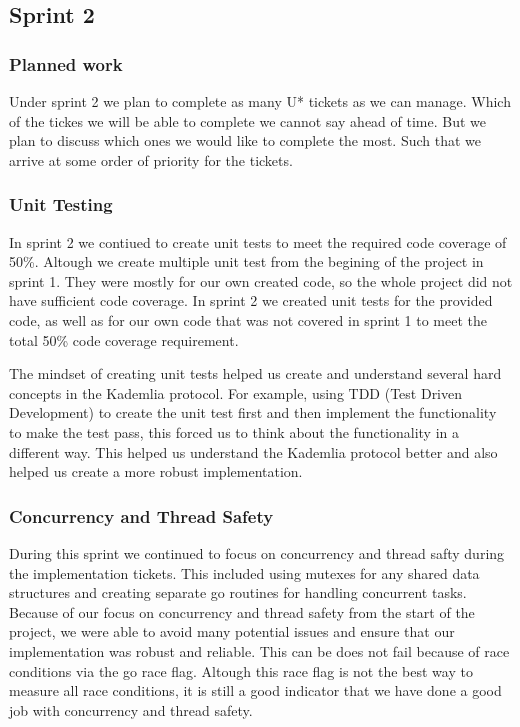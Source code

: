 \subsection{Sprint 2}

\subsubsection{Planned work}
Under sprint 2 we plan to complete as many U* tickets as we can manage. Which of the tickes we will be able to complete we cannot say ahead of time. But we plan to discuss which ones we would like to complete the most. Such that we arrive at some order of priority for the tickets.

\subsubsection{Unit Testing}
In sprint 2 we contiued to create unit tests to meet the required code coverage of 50\%. Altough we create multiple unit test from the begining of the project in sprint 1. They were mostly for our own created code, so the whole project did not have sufficient code coverage. In sprint 2 we created unit tests for the provided code, as well as for our own code that was not covered in sprint 1 to meet the total 50\% code coverage requirement.

The mindset of creating unit tests helped us create and understand several hard concepts in the Kademlia protocol. For example, using TDD (Test Driven Development) to create the unit test first and then implement the functionality to make the test pass, this forced us to think about the functionality in a different way. This helped us understand the Kademlia protocol better and also helped us create a more robust implementation.

\subsubsection{Concurrency and Thread Safety}
During this sprint we continued to focus on concurrency and thread safty during the implementation tickets. This included using mutexes for any shared data structures and creating separate go routines for handling concurrent tasks. Because of our focus on concurrency and thread safety from the start of the project, we were able to avoid many potential issues and ensure that our implementation was robust and reliable. This can be does not fail because of race conditions via the go race flag. Altough this race flag is not the best way to measure all race conditions, it is still a good indicator that we have done a good job with concurrency and thread safety.

